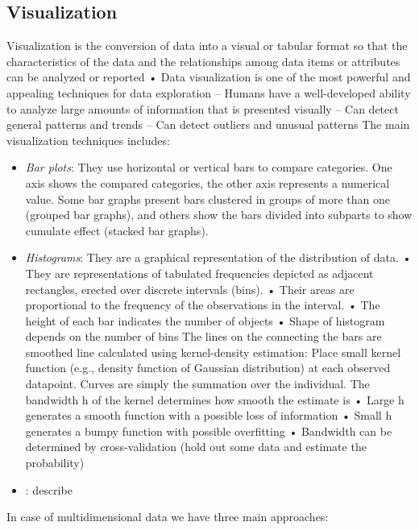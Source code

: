 \subsection{Visualization}
Visualization is the conversion of data into a visual or tabular format so that the characteristics of
the data and the relationships among data items or attributes can be analyzed or reported
• Data visualization is one of the most powerful and appealing techniques for data exploration
– Humans have a well-developed ability to analyze large amounts of information that is
presented visually
– Can detect general patterns and trends
– Can detect outliers and unusual patterns 
The main visualization techniques includes: 
\begin{itemize}
    \item \textit{Bar plots}: They use horizontal or vertical bars to compare categories.
        One axis shows the compared categories, the other axis represents a numerical value.
        Some bar graphs present bars clustered in groups of more than one (grouped bar graphs), and others show the bars divided into subparts to show cumulate effect (stacked bar graphs).
    \item \textit{Histograms}: They are a graphical representation of the distribution of data.
• They are representations of tabulated frequencies depicted as adjacent rectangles, erected over discrete intervals (bins).
• Their areas are proportional to the frequency of the observations in the interval.
• The height of each bar indicates the number of objects
• Shape of histogram depends on the number of bins
The lines on the connecting the bars are smoothed line calculated using kernel-density estimation: Place small kernel function (e.g., density function of Gaussian distribution) at each observed datapoint.
Curves are simply the summation over the individual. 
The bandwidth h of the kernel determines how smooth the estimate is
• Large h generates a smooth function with a possible loss of information
• Small h generates a bumpy function with possible overfitting
• Bandwidth can be determined by cross-validation
(hold out some data and estimate the probability) 
    \item {}: describe
\end{itemize}
In case of multidimensional data we have three main approaches: 
